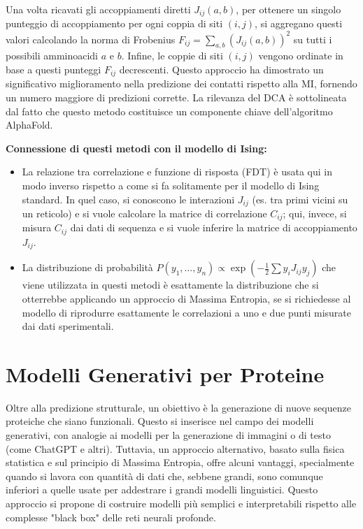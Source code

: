 Una volta ricavati gli accoppiamenti diretti $J_{ij}(a,b)$, per ottenere un singolo punteggio di accoppiamento per ogni coppia di siti $(i,j)$, si aggregano questi valori calcolando la norma di Frobenius $F_{ij} = \sum_{a,b} (J_{ij}(a,b))^2$ su tutti i possibili amminoacidi $a$ e $b$.
Infine, le coppie di siti $(i,j)$ vengono ordinate in base a questi punteggi $F_{ij}$ decrescenti. Questo approccio ha dimostrato un significativo miglioramento nella predizione dei contatti rispetto alla MI, fornendo un numero maggiore di predizioni corrette.
La rilevanza del DCA è sottolineata dal fatto che questo metodo costituisce un componente chiave dell'algoritmo AlphaFold.

\textbf{Connessione di questi metodi con il modello di Ising:}
\begin{itemize}
    \item La relazione tra correlazione e funzione di risposta (FDT) è usata qui in modo inverso rispetto a come si fa solitamente per il modello di Ising standard. In quel caso, si conoscono le interazioni $J_{ij}$ (es. tra primi vicini su un reticolo) e si vuole calcolare la matrice di correlazione $C_{ij}$; qui, invece, si misura $C_{ij}$ dai dati di sequenza e si vuole inferire la matrice di accoppiamento $J_{ij}$.
    \item La distribuzione di probabilità $P(y_1, \dots, y_n) \propto \exp(-\frac{1}{2} \sum y_i J_{ij} y_j)$ che viene utilizzata in questi metodi è esattamente la distribuzione che si otterrebbe applicando un approccio di Massima Entropia, se si richiedesse al modello di riprodurre esattamente le correlazioni a uno e due punti misurate dai dati sperimentali.
\end{itemize}


\section{Modelli Generativi per Proteine}
Oltre alla predizione strutturale, un obiettivo è la generazione di nuove sequenze proteiche che siano funzionali. Questo si inserisce nel campo dei modelli generativi, con analogie ai modelli per la generazione di immagini o di testo (come ChatGPT e altri).
Tuttavia, un approccio alternativo, basato sulla fisica statistica e sul principio di Massima Entropia, offre alcuni vantaggi, specialmente quando si lavora con quantità di dati che, sebbene grandi, sono comunque inferiori a quelle usate per addestrare i grandi modelli linguistici. Questo approccio si propone di costruire modelli più semplici e interpretabili rispetto alle complesse "black box" delle reti neurali profonde.


